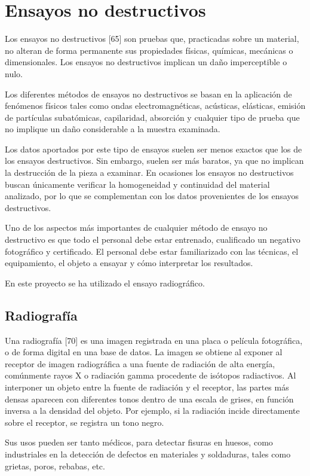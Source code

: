 \section{Ensayos no destructivos}
Los ensayos no destructivos [65] son pruebas que, practicadas sobre un material, no alteran de forma permanente sus propiedades físicas, químicas, mecánicas o dimensionales. Los ensayos no destructivos implican un daño imperceptible o nulo.

Los diferentes métodos de ensayos no destructivos se basan en la aplicación de fenómenos físicos tales como ondas electromagnéticas, acústicas, elásticas, emisión de partículas subatómicas, capilaridad, absorción y cualquier tipo de prueba que no implique un daño considerable a la muestra examinada.

Los datos aportados por este tipo de ensayos suelen ser menos exactos que los de los ensayos destructivos. Sin embargo, suelen ser más baratos, ya que no implican la destrucción de la pieza a examinar. En ocasiones los ensayos no destructivos buscan únicamente verificar la homogeneidad y continuidad del material analizado, por lo que se complementan con los datos provenientes de los ensayos destructivos.

Uno de los aspectos más importantes de cualquier método de ensayo no destructivo es que todo el personal debe estar entrenado, cualificado un negativo fotográfico y certificado. El personal debe estar familiarizado con las técnicas, el equipamiento, el objeto a ensayar y cómo interpretar los resultados.

En este proyecto se ha utilizado el ensayo radiográfico.

\subsection{Radiografía}
Una radiografía [70] es una imagen registrada en una placa o película fotográfica, o de forma digital en una base de datos. La imagen se obtiene al exponer al receptor de imagen radiográfica a una fuente de radiación de alta energía, comúnmente rayos X o radiación gamma procedente de isótopos radiactivos. Al interponer un objeto entre la fuente de radiación y el receptor, las partes más densas aparecen con diferentes tonos dentro de una escala de grises, en función inversa a la densidad del objeto. Por ejemplo, si la radiación incide directamente sobre el receptor, se registra un tono negro.

Sus usos pueden ser tanto médicos, para detectar fisuras en huesos, como industriales en la detección de defectos en materiales y soldaduras, tales como grietas, poros, rebabas, etc.

